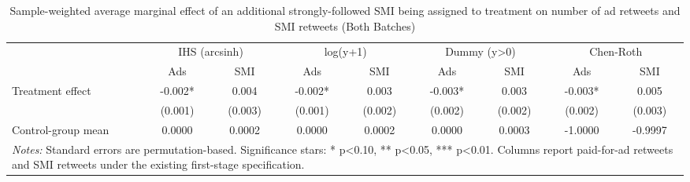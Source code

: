 \begin{table}[!htbp]
\centering
\caption{Sample-weighted average marginal effect of an additional strongly-followed SMI being assigned to treatment on number of ad retweets and SMI retweets (Both Batches)}
\begin{tabular}{lcccccccc}
\hline
 & \multicolumn{2}{c}{IHS (arcsinh)} & \multicolumn{2}{c}{log(y+1)} & \multicolumn{2}{c}{Dummy (y>0)} & \multicolumn{2}{c}{Chen-Roth} \\
 & Ads & SMI & Ads & SMI & Ads & SMI & Ads & SMI \\
\hline
Treatment effect & -0.002* & 0.004 & -0.002* & 0.003 & -0.003* & 0.003 & -0.003* & 0.005 \\
 & (0.001) & (0.003) & (0.001) & (0.002) & (0.002) & (0.002) & (0.002) & (0.003) \\
Control-group mean & 0.0000 & 0.0002 & 0.0000 & 0.0002 & 0.0000 & 0.0003 & -1.0000 & -0.9997 \\
\hline
\multicolumn{9}{l}{\parbox[t]{15.5cm}{\textit{Notes:} Standard errors are permutation-based. Significance stars: * p<0.10, ** p<0.05, *** p<0.01. Columns report paid-for-ad retweets and SMI retweets under the existing first-stage specification.}} \\
\end{tabular}
\end{table}
